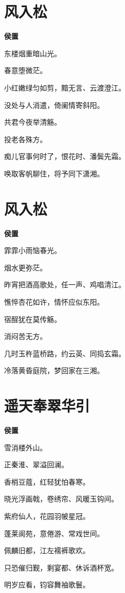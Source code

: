 \documentclass[12pt,a4paper]{ctexbook}
\begin{document}
\section{风入松}
\textbf{侯置}\par\vspace{0.5em}
东楼烟重暗山光。\par
春意堕微茫。\par
小红嫩绿匀如剪，黯无言、云渡澄江。\par
没处与人消遣，倚阑情寄斜阳。\par
共君今夜举清觞。\par
投老各殊方。\par
痴儿官事何时了，恨花时、潘鬓先霜。\par
唤取客帆聊住，将予同下潇湘。\par

\section{风入松}
\textbf{侯置}\par\vspace{0.5em}
霏霏小雨恼春光。\par
烟水更弥茫。\par
昨宵把酒高歌处，任一声、鸡唱清江。\par
憔悴杏花如许，情怀应似东阳。\par
宿酲犹在莫传觞。\par
消闷苦无方。\par
几时玉杵蓝桥路，约云英、同捣玄霜。\par
冷落黄昏庭院，梦回家在三湘。\par

\section{遥天奉翠华引}
\textbf{侯置}\par\vspace{0.5em}
雪消楼外山。\par
正秦淮、翠溢回澜。\par
香梢豆蔻，红轻犹怕春寒。\par
晓光浮画戟，卷绣帘、风暖玉钩间。\par
紫府仙人，花园羽帔星冠。\par
蓬莱阆苑，意倦游、常戏世间。\par
佩麟旧都，江左襦裤歌欢。\par
只恐催归觐，剩宴都、休诉酒杯宽。\par
明岁应看，钧容舞袖歌鬟。\par
\end{document}
